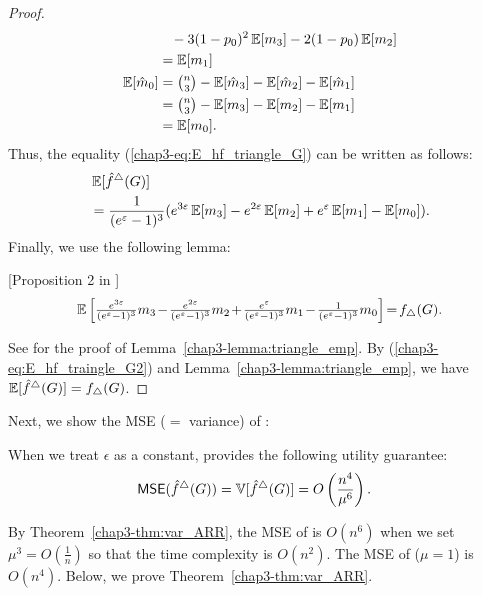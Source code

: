 \begin{proof}
\begin{align*}
& \hspace{3mm} - 3(1-p_0)^2 \operatorname{\mathbb{E}}[m_3] - 2(1-p_0) \operatorname{\mathbb{E}}[m_2] \\ &= \operatorname{\mathbb{E}}[m_1] \\
\operatorname{\mathbb{E}}[\hat{m}_0]
&= \textstyle{\binom{n}{3} - \operatorname{\mathbb{E}}[\hat{m}_3] - \operatorname{\mathbb{E}}[\hat{m}_2] - \operatorname{\mathbb{E}}[\hat{m}_1]} \\
&= \textstyle{\binom{n}{3} - \operatorname{\mathbb{E}}[m_3] - \operatorname{\mathbb{E}}[m_2] - \operatorname{\mathbb{E}}[m_1]} \\
&= \operatorname{\mathbb{E}}[m_0].
\end{align*}
Thus, the equality (\ref{chap3-eq:E_hf_triangle_G}) can be written as follows:
\begin{align}
& \E[\hf^\triangle(G)] \nonumber\\
&= \frac{1}{(e^\epsilon-1)^3}(e^{3\epsilon} \E[m_3] - e^{2\epsilon} \E[m_2] + e^\epsilon \E[m_1] - \E[m_0]).
\label{chap3-eq:E_hf_traingle_G2}
\end{align}
Finally, we use the following lemma:

\begin{lemma}\label{chap3-lemma:triangle_emp}[Proposition 2 in \cite{Imola_USENIX21}]
  \begin{align}
      \textstyle{\mathbb{E}\left[ \frac{e^{3\epsilon}}{(e^\epsilon-1)^3} m_3 \hspace{-0.5mm}-\hspace{-0.5mm} \frac{e^{2\epsilon}}{(e^\epsilon-1)^3} m_2 \hspace{-0.5mm}+\hspace{-0.5mm} \frac{e^\epsilon}{(e^\epsilon-1)^3} m_1 \hspace{-0.5mm}-\hspace{-0.5mm} \frac{1}{(e^\epsilon-1)^3} m_0 \right] \hspace{-0.5mm} = \hspace{-0.5mm} f_\triangle(G).}
      \label{chap3-eq:triangle_emp}
  \end{align}
\end{lemma}
See \cite{Imola_USENIX21} for the proof of Lemma~\ref{chap3-lemma:triangle_emp}.
By (\ref{chap3-eq:E_hf_traingle_G2}) and Lemma~\ref{chap3-lemma:triangle_emp}, we have $\operatorname{\mathbb{E}}[\hat{f}^\triangle(G)] = f_\triangle(G)$.
\end{proof}

Next, we show the MSE ($=$ variance) of \AlgARRTri{}:
\begin{theorem}
\label{chap3-thm:var_ARR}
When we treat $\epsilon$ as a constant,
\AlgARRTri{} provides the following utility guarantee:
\begin{align*}
& \operatorname{\textsf{MSE}}(\hat{f}^\triangle(G)) = \operatorname{\mathbb{V}}[\hat{f}^\triangle(G)] = O\left(\frac{n^4}{\mu^6}\right).
\end{align*}
\end{theorem}
By Theorem~\ref{chap3-thm:var_ARR}, the MSE of \AlgARRTri{} is $O(n^6)$ when we set $\mu^3=O(\frac{1}{n})$ so that the time complexity is $O(n^2)$.
The MSE of \AlgRRTri{} ($\mu=1$) is $O(n^4)$.
Below, we prove Theorem~\ref{chap3-thm:var_ARR}.

